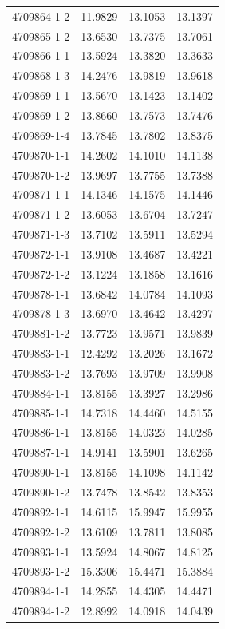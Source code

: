 \begin{longtable}{lrrr}
4709864-1-2 & 11.9829 & 13.1053 & 13.1397 \\
4709865-1-2 & 13.6530 & 13.7375 & 13.7061 \\
4709866-1-1 & 13.5924 & 13.3820 & 13.3633 \\
4709868-1-3 & 14.2476 & 13.9819 & 13.9618 \\
4709869-1-1 & 13.5670 & 13.1423 & 13.1402 \\
4709869-1-2 & 13.8660 & 13.7573 & 13.7476 \\
4709869-1-4 & 13.7845 & 13.7802 & 13.8375 \\
4709870-1-1 & 14.2602 & 14.1010 & 14.1138 \\
4709870-1-2 & 13.9697 & 13.7755 & 13.7388 \\
4709871-1-1 & 14.1346 & 14.1575 & 14.1446 \\
4709871-1-2 & 13.6053 & 13.6704 & 13.7247 \\
4709871-1-3 & 13.7102 & 13.5911 & 13.5294 \\
4709872-1-1 & 13.9108 & 13.4687 & 13.4221 \\
4709872-1-2 & 13.1224 & 13.1858 & 13.1616 \\
4709878-1-1 & 13.6842 & 14.0784 & 14.1093 \\
4709878-1-3 & 13.6970 & 13.4642 & 13.4297 \\
4709881-1-2 & 13.7723 & 13.9571 & 13.9839 \\
4709883-1-1 & 12.4292 & 13.2026 & 13.1672 \\
4709883-1-2 & 13.7693 & 13.9709 & 13.9908 \\
4709884-1-1 & 13.8155 & 13.3927 & 13.2986 \\
4709885-1-1 & 14.7318 & 14.4460 & 14.5155 \\
4709886-1-1 & 13.8155 & 14.0323 & 14.0285 \\
4709887-1-1 & 14.9141 & 13.5901 & 13.6265 \\
4709890-1-1 & 13.8155 & 14.1098 & 14.1142 \\
4709890-1-2 & 13.7478 & 13.8542 & 13.8353 \\
4709892-1-1 & 14.6115 & 15.9947 & 15.9955 \\
4709892-1-2 & 13.6109 & 13.7811 & 13.8085 \\
4709893-1-1 & 13.5924 & 14.8067 & 14.8125 \\
4709893-1-2 & 15.3306 & 15.4471 & 15.3884 \\
4709894-1-1 & 14.2855 & 14.4305 & 14.4471 \\
4709894-1-2 & 12.8992 & 14.0918 & 14.0439 \\

\end{longtable}
